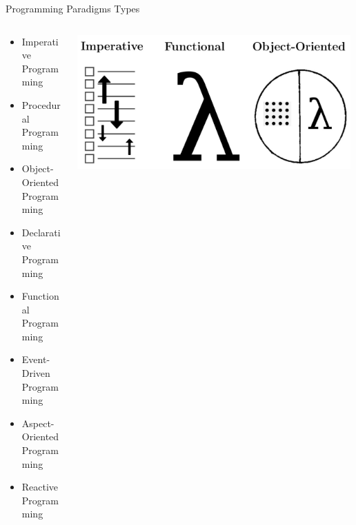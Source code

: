 \documentclass{beamer}
\begin{document}
\begin{frame}{Programming Paradigms Types}
	\small
	\begin{columns}[T] %
    	\begin{column}{.5\textwidth} %
		\begin{itemize}
			\item Imperative Programming
			\item Procedural Programming
			\item Object-Oriented Programming
			\item Declarative Programming
			\item Functional Programming
			\item Event-Driven Programming
			\item Aspect-Oriented Programming
			\item Reactive Programming
		\end{itemize}
    	\end{column}
    	\begin{column}{.5\textwidth} %
    		\includegraphics[width=0.99\textwidth, height=0.4\textheight]{img/para-types.png}
   		\end{column}
  	\end{columns}
\end{frame}
\end{document}
